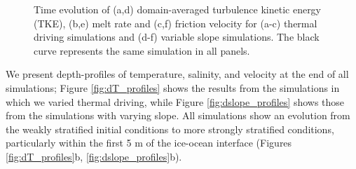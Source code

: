 \documentclass[draft]{agujournal2019}
\begin{document}
\begin{figure}[h!]
\begin{minipage}{0.33\textwidth}
    \end{minipage}
    \caption{Time evolution of (a,d) domain-averaged turbulence kinetic energy (TKE), (b,e) melt rate and (c,f) friction velocity for (a-c) thermal driving simulations and (d-f) variable slope simulations. The black curve represents the same simulation in all panels.}
    \label{fig:timeseries}
\end{figure}

We present depth-profiles of temperature, salinity, and velocity at the end of all simulations; Figure \ref{fig:dT_profiles} shows the results from the simulations in which we varied thermal driving, while Figure \ref{fig:dslope_profiles} shows those from the simulations with varying slope. All simulations show an evolution from the weakly stratified initial conditions to more strongly stratified conditions, particularly within the first 5 m of the ice-ocean interface (Figures \ref{fig:dT_profiles}b, \ref{fig:dslope_profiles}b). 
\end{document}
